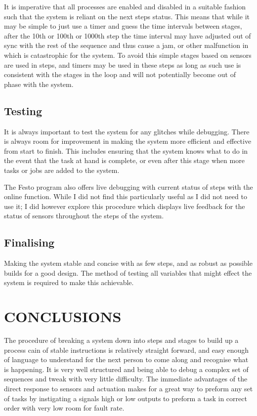 \documentclass[a4paper, 10pt,  conference]{article}
\begin{document}
It is imperative that all processes are enabled and disabled in a suitable fashion such that the system is reliant on the next steps status. This means that while it may be simple to just use a timer and guess the time intervals between stages, after the 10th or 100th or 1000th step the time interval may have adjusted out of sync with the rest of the sequence and thus cause a jam, or other malfunction in which is catastrophic for the system. To avoid this simple stages based on sensors are used in steps, and timers may be used in these steps as long as such use is consistent with the stages in the loop and will not potentially become out of phase with the system.

\clearpage

\subsection{Testing}
It is always important to test the system for any glitches while debugging. There is always room for improvement in making the system more efficient and effective from start to finish. This includes ensuring that the system knows what to do in the event that the task at hand is complete, or even after this stage when more tasks or jobs are added to the system.

The Festo program also offers live debugging with current status of steps with the online function. While I did not find this particularly useful as I did not need to use it; I did however explore this procedure which displays live feedback for the status of sensors throughout the steps of the system.



\subsection{Finalising}
Making the system stable and concise with as few steps, and as robust as possible builds for a good design. The method of testing all variables that might effect the system is required to make this achievable. 




\section{CONCLUSIONS}
The procedure of breaking a system down into steps and stages to build up a process cain of stable instructions is relatively straight forward, and easy enough of language to understand for the next person to come along and recognise what is happening. It is very well structured and being able to debug a complex set of sequences and tweak with very little difficulty. The immediate advantages of the direct response to sensors and actuation makes for a great way to preform any set of tasks by instigating a signals high or low outputs to preform a task in correct order with very low room for fault rate.
\end{document}
